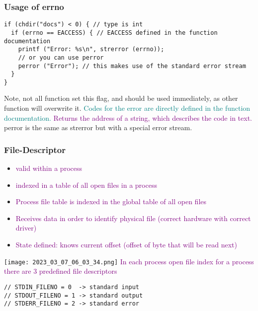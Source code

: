 \documentclass[main.tex,fontsize=8pt,paper=a4,paper=portrait,DIV=calc,]{scrartcl}
\begin{document}
\subsubsection{Usage of errno}
\begin{lstlisting}
if (chdir("docs") < 0) { // type is int
  if (errno == EACCESS) { // EACCESS defined in the function documentation
    printf ("Error: %s\n", strerror (errno));
    // or you can use perror
    perror ("Error"); // this makes use of the standard error stream
  }
}
\end{lstlisting}
Note, not all function set this flag, and should be used immediately, as other function will overwrite it.\newline
\textcolor{teal}{Codes for the error are directly defined in the function documentation.}\newline
\textcolor{purple}{Returns the address of a string, which describes the code in text.}\newline
perror is the same as strerror but with a special error stream.

\subsubsection{File-Descriptor}
\begin{itemize}
\item \textcolor{purple}{valid within a process}
\item \textcolor{purple}{indexed in a table of all open files in a process}
\item \textcolor{purple}{Process file table is indexed in the global table of all open files}
\item \textcolor{purple}{Receives data in order to identify physical file (correct hardware with correct driver)}
\item \textcolor{purple}{State defined: knows current offset (offset of byte that will be read next)}
\end{itemize} 
\texttt{[image: 2023\_03\_07\_06\_03\_34.png]}\newline
\textcolor{purple}{In each process open file index for a process there are 3 predefined file descriptors}\newline
\begin{lstlisting}
// STDIN_FILENO = 0  -> standard input
// STDOUT_FILENO = 1 -> standard output
// STDERR_FILENO = 2 -> standard error
\end{lstlisting}
\end{document}
